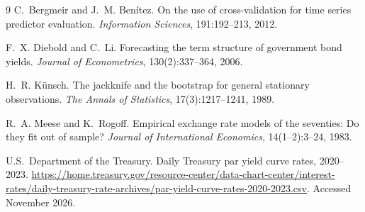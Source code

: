 \documentclass{article}
\begin{document}
\begin{thebibliography}{9}
C.~Bergmeir and J.~M. Ben\'itez. On the use of cross-validation for time series predictor evaluation. \emph{Information Sciences}, 191:192--213, 2012.

F.~X. Diebold and C.~Li. Forecasting the term structure of government bond yields. \emph{Journal of Econometrics}, 130(2):337--364, 2006.

H.~R. K\"unsch. The jackknife and the bootstrap for general stationary observations. \emph{The Annals of Statistics}, 17(3):1217--1241, 1989.

R.~A. Meese and K.~Rogoff. Empirical exchange rate models of the seventies: Do they fit out of sample? \emph{Journal of International Economics}, 14(1--2):3--24, 1983.

U.S.\ Department of the Treasury. Daily Treasury par yield curve rates, 2020--2023. \url{https://home.treasury.gov/resource-center/data-chart-center/interest-rates/daily-treasury-rate-archives/par-yield-curve-rates-2020-2023.csv}. Accessed November 2026.
\end{thebibliography}
\end{document}
